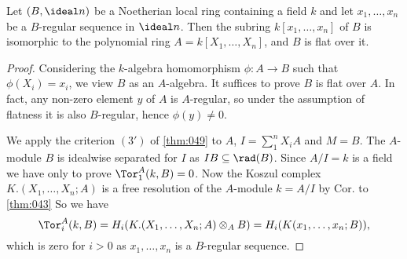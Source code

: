 \documentclass[../main]{subfiles}
\begin{document}
\begin{parapplication}[Hartshorne] Let $(B,\ideal n)$ be a Noetherian local ring containing a field $k$ and let $x_1, \dots, x_n$ be a $B$-regular sequence in $\ideal n$. Then the subring $k[x_1,\dots,x_n]$ of $B$ is isomorphic to the polynomial ring $A = k[X_1,\dots,X_n]$, and $B$ is flat over it.
\end{parapplication}
\begin{proof}
Considering the $k$-algebra homomorphism $\phi\colon A\longrightarrow B$ such that $\phi(X_i) = x_i$, we view $B$ as an $A$-algebra. It suffices to prove $B$ is flat over $A$. In fact, any non-zero element $y$ of $A$ is $A$-regular, so under the assumption of flatness it is also $B$-regular, hence $\phi(y)\neq 0$.

We apply the criterion $(3')$ of \ref{thm:049} to $A$, $I = \sum_1^n X_iA$ and $M = B$. The $A$-module $B$ is idealwise separated for $I$ as $IB\subseteq \rad(B)$. Since $A/I = k$ is a field we have only to prove $\Tor_1^A(k,B) = 0$. Now the Koszul complex $K.(X_1,\dots,X_n;A)$ is a free resolution of the $A$-module $k = A/I$ by Cor. to \ref{thm:043} So we have \[\Tor_i^A(k,B) = H_i(K.(X_1,\dots,X_n;A)\otimes_A B)= H_i(K(x_1,\dots,x_n;B)),\] which is zero for $i>0$ as $x_1,\dots,x_n$ is a $B$-regular sequence.
\end{proof}
\end{document}
